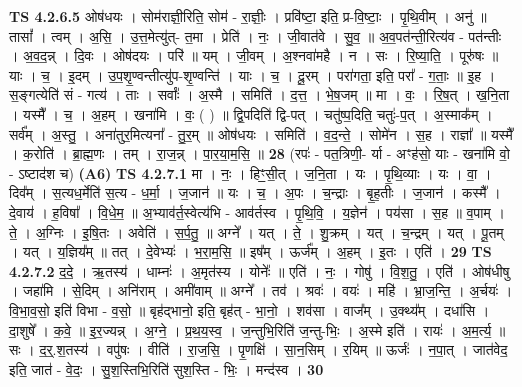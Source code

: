 \documentclass[17pt]{extarticle}
\begin{document}
                  \newline
                                \textbf{ TS 4.2.6.5} \newline
                  ओष॑धयः । सोम॑राज्ञी॒रिति॒ सोम॑ - रा॒ज्ञीः॒ । प्रवि॑ष्टा॒ इति॒ प्र-वि॒ष्टाः॒ । पृ॒थि॒वीम् । अनु॑ ॥ तासां᳚ । त्वम् । अ॒सि॒ । उ॒त्त॒मेत्यु॑त्- त॒मा । प्रेति॑ । नः॒ । जी॒वात॑वे । सु॒व॒ ॥ अ॒व॒पत॑न्ती॒रित्य॑व - पत॑न्तीः । अ॒व॒द॒न्न् । दि॒वः । ओष॑दयः । परि॑ ॥ यम् । जी॒वम् । अ॒श्नवा॑महै । न । सः । रि॒ष्या॒ति॒ । पूरु॑षः ॥ याः । च॒ । इ॒दम् । उ॒प॒शृ॒ण्वन्तीत्यु॑प-शृ॒ण्वन्ति॑ । याः । च॒ । दू॒रम् । परा॑गता॒ इति॒ परा᳚ - ग॒ताः॒ ॥ इ॒ह । स॒ङ्गत्येति॑ सं - गत्य॑ । ताः । सर्वाः᳚ । अ॒स्मै । समिति॑ । द॒त्त॒ । भे॒ष॒जम् ॥ मा । वः॒ । रि॒ष॒त् । ख॒नि॒ता । यस्मै᳚ । च॒ । अ॒हम् । खना॑मि । वः॒ ( ) ॥ द्वि॒पदिति॑ द्वि-पत् । चतु॑ष्प॒दिति॒ चतुः॑-प॒त् । अ॒स्माक᳚म् । सर्व᳚म् । अ॒स्तु॒ । अना॑तुर॒मित्यना᳚ - तु॒र॒म् ॥ ओष॑धयः । समिति॑ । व॒द॒न्ते॒ । सोमे॑न । स॒ह । राज्ञा᳚ ॥ यस्मै᳚ । क॒रोति॑ । ब्रा॒ह्म॒णः । तम् । रा॒ज॒न्न् । पा॒र॒या॒म॒सि॒ ॥ \textbf{  28} \newline
                  \newline
                      (रपः॑ - पत॒त्रिणी॒- र्या - अꣳह॑सो॒ याः - खना॑मि वो॒ - ऽष्टाद॑श च)  \textbf{(A6)} \newline \newline
                                \textbf{ TS 4.2.7.1} \newline
                  मा । नः॒ । हिꣳ॒॒सी॒त् । ज॒नि॒ता । यः । पृ॒थि॒व्याः । यः । वा॒ । दिव᳚म् । स॒त्यध॒र्मेति॑ स॒त्य - ध॒र्मा॒ । ज॒जान॑ ॥ यः । च॒ । अ॒पः । च॒न्द्राः । बृ॒ह॒तीः । ज॒जान॑ । कस्मै᳚ । दे॒वाय॑ । ह॒विषा᳚ । वि॒धे॒म॒ ॥ अ॒भ्याव॑र्त॒स्वेत्य॑भि - आव॑र्तस्व । पृ॒थि॒वि॒ । य॒ज्ञेन॑ । पय॑सा । स॒ह ॥ व॒पाम् । ते॒ । अ॒ग्निः । इ॒षि॒तः । अवेति॑ । स॒र्प॒तु॒ ॥ अग्ने᳚ । यत् । ते॒ । शु॒क्रम् । यत् । च॒न्द्रम् । यत् । पू॒तम् । यत् । य॒ज्ञिय᳚म् ॥ तत् । दे॒वेभ्यः॑ । भ॒रा॒म॒सि॒ ॥ इष᳚म् । ऊर्ज᳚म् । अ॒हम् । इ॒तः । एति॑ । \textbf{  29} \newline
                  \newline
                                \textbf{ TS 4.2.7.2} \newline
                  द॒दे॒ । ऋ॒तस्य॑ । धाम्नः॑ । अ॒मृत॑स्य । योनेः᳚ ॥ एति॑ । नः॒ । गोषु॑ । वि॒श॒तु॒ । एति॑ । ओष॑धीषु । जहा॑मि । से॒दिम् । अनि॑राम् । अमी॑वाम् ॥ अग्ने᳚ । तव॑ । श्रवः॑ । वयः॑ । महि॑ । भ्रा॒ज॒न्ति॒ । अ॒र्चयः॑ । वि॒भा॒व॒सो॒ इति॑ विभा - व॒सो॒ ॥ बृह॑द्भानो॒ इति॒ बृह॑त् - भा॒नो॒ । शव॑सा । वाज᳚म् । उ॒क्थ्य᳚म् । दधा॑सि । दा॒शुषे᳚ । क॒वे॒ ॥ इ॒र॒ज्यन्न् । अ॒ग्ने॒ । प्र॒थ॒य॒स्व॒ । ज॒न्तुभि॒रिति॑ ज॒न्तु-भिः॒ । अ॒स्मे इति॑ । रायः॑ । अ॒म॒र्त्य॒ ॥ सः । द॒र्॒.श॒तस्य॑ । वपु॑षः । वीति॑ । रा॒ज॒सि॒ । पृ॒णक्षि॑ । सा॒न॒सिम् । र॒यिम् ॥ ऊर्जः॑ । न॒पा॒त् । जात॑वेद॒ इति॒ जात॑ - वे॒दः॒ । सु॒श॒स्तिभि॒रिति॑ सुश॒स्ति - भिः॒ । मन्द॑स्व । \textbf{  30} \newline
\end{document}
